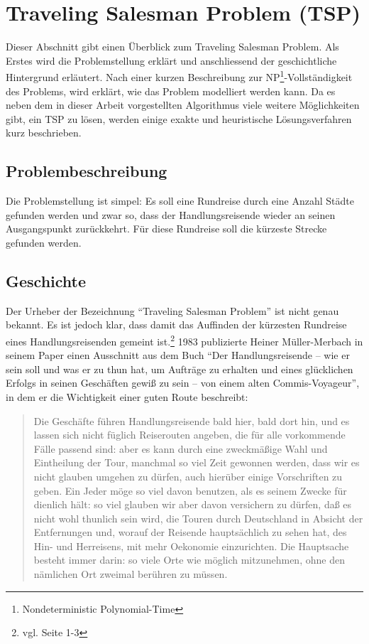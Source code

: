\documentclass[11pt,a4paper]{article}
\begin{document}
\newpage
\section{Traveling Salesman Problem (TSP)}
\label{s:traveling_salesman_problem}
Dieser Abschnitt gibt einen Überblick zum Traveling Salesman Problem. Als Erstes wird die Problemstellung erklärt und anschliessend der geschichtliche Hintergrund erläutert. Nach einer kurzen Beschreibung zur NP\footnote{Nondeterministic Polynomial-Time}-Vollständigkeit des Problems, wird erklärt, wie das Problem modelliert werden kann. Da es neben dem in dieser Arbeit vorgestellten Algorithmus viele weitere Möglichkeiten gibt, ein TSP zu lösen, werden einige exakte und heuristische Lösungsverfahren kurz beschrieben.

\subsection{Problembeschreibung}
Die Problemstellung ist simpel: Es soll eine Rundreise durch eine Anzahl Städte gefunden werden und zwar so, dass der Handlungsreisende wieder an seinen Ausgangspunkt zurückkehrt. Für diese Rundreise soll die kürzeste Strecke gefunden werden.

\subsection{Geschichte}
Der Urheber der Bezeichnung "`Traveling Salesman Problem"' ist nicht genau bekannt. Es ist jedoch klar, dass damit das Auffinden der kürzesten Rundreise eines Handlungsreisenden gemeint ist.\footnote{vgl. \cite{applegate06} Seite 1-3} 1983 publizierte Heiner Müller-Merbach in seinem Paper\cite{mueller83} einen Ausschnitt aus dem Buch "`Der Handlungsreisende – wie er sein soll und was er zu thun hat, um Aufträge zu erhalten und eines glücklichen Erfolgs in seinen Geschäften gewiß zu sein – von einem alten Commis-Voyageur"', in dem er die Wichtigkeit einer guten Route beschreibt:  
\begin{quotation}
Die Geschäfte führen Handlungsreisende bald hier, bald dort hin, und es lassen sich nicht füglich Reiserouten angeben, die für alle vorkommende Fälle passend sind: aber es kann durch eine zweckmäßige Wahl und Eintheilung der Tour, manchmal so viel Zeit gewonnen werden, dass wir es nicht glauben umgehen zu dürfen, auch hierüber einige Vorschriften zu geben. Ein Jeder möge so viel davon benutzen, als es seinem Zwecke für dienlich hält: so viel glauben wir aber davon versichern zu dürfen, daß es nicht wohl thunlich sein wird, die Touren durch Deutschland in Absicht der Entfernungen und, worauf der Reisende hauptsächlich zu sehen hat, des Hin- und Herreisens, mit mehr Oekonomie einzurichten. Die Hauptsache besteht immer darin: so viele Orte wie möglich mitzunehmen, ohne den nämlichen Ort zweimal berühren zu müssen.
\end{quotation}
\end{document}
